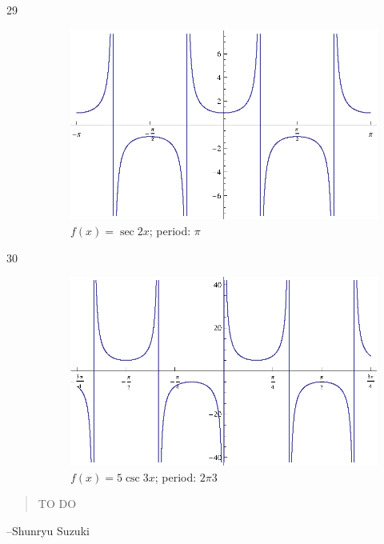 \documentclass{exam}
\begin{document}
\begin{description}
      \item[29]
        \begin{figure}[H]
          \centering
          \includegraphics[scale=0.9]{exercise29.eps}
          \caption{$f(x) = \sec 2x $; period: $\pi$}
        \end{figure}

      \item[30]
        \begin{figure}[H]
          \centering
          \includegraphics[scale=0.9]{exercise30.eps}
          \caption{$f(x) = 5 \csc 3x $; period: ${2 \pi}{3}$}
        \end{figure}





    \end{description}
  \else
    \vspace{1 cm}
    \begin{quote}
      \begin{em}
        TO DO
      \end{em}
    \end{quote}
    \hspace{1 cm} --Shunryu Suzuki
  \fi
\end{document}
